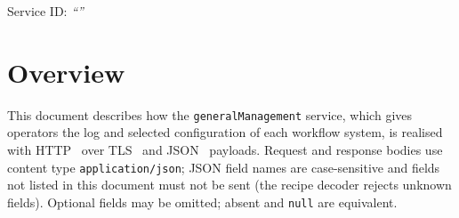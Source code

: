 \documentclass[a4paper]{arrowhead}
\begin{document}
\ArrowheadSetup

\begin{center}
  \vspace*{1cm}
  \huge{\arrowtitle}

  \vspace*{0.2cm}
  \LARGE{\arrowtype}
  \vspace*{1cm}

  \Large{Service ID: \textit{``\arrowid''}}
  \vspace*{\fill}

  

  \vspace*{1cm}
  \vspace*{\fill}

  \begin{abstract}
    This document describes the HTTP/TLS/JSON interface of the \texttt{generalManagement} service of the Eclipse Arrowhead workflow support systems, service version 1.0.0, documentation edition 5.4.0. It realises the abstract operations of the \texttt{generalManagement} SD.
  \end{abstract}

  \vspace*{1cm}
\end{center}

\newpage

\tableofcontents
\newpage

\section{Overview}
\label{sec:overview}
This document describes how the \texttt{generalManagement} service, which gives operators the log and selected configuration of each workflow system, is realised with HTTP~\cite{rfc9110}
over TLS~\cite{rfc8446} and JSON~\cite{rfc8259} payloads. Request and response bodies use content type
\texttt{application/json}; JSON field names are case-sensitive and fields not listed in this document must not be sent
(the recipe decoder rejects unknown fields). Optional fields may be omitted; absent and \texttt{null} are equivalent.
\end{document}
